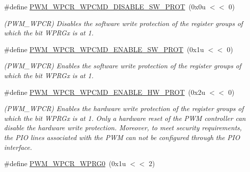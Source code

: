\begin{DoxyCompactItemize}
\item 
\mbox{\label{group__SAMS70__PWM_gab2d512be66c678ac9d977f2bc8cd01ea}} 
\#define \mbox{\hyperlink{group__SAMS70__PWM_gab2d512be66c678ac9d977f2bc8cd01ea}{P\+W\+M\+\_\+\+W\+P\+C\+R\+\_\+\+W\+P\+C\+M\+D\+\_\+\+D\+I\+S\+A\+B\+L\+E\+\_\+\+S\+W\+\_\+\+P\+R\+OT}}~(0x0u $<$$<$ 0)
\begin{DoxyCompactList}\small\item\em (P\+W\+M\+\_\+\+W\+P\+CR) Disables the software write protection of the register groups of which the bit W\+P\+R\+Gx is at \textquotesingle{}1\textquotesingle{}. \end{DoxyCompactList}\item 
\mbox{\label{group__SAMS70__PWM_gad0d48ff8ca75be8265e7caf42e9c8e37}} 
\#define \mbox{\hyperlink{group__SAMS70__PWM_gad0d48ff8ca75be8265e7caf42e9c8e37}{P\+W\+M\+\_\+\+W\+P\+C\+R\+\_\+\+W\+P\+C\+M\+D\+\_\+\+E\+N\+A\+B\+L\+E\+\_\+\+S\+W\+\_\+\+P\+R\+OT}}~(0x1u $<$$<$ 0)
\begin{DoxyCompactList}\small\item\em (P\+W\+M\+\_\+\+W\+P\+CR) Enables the software write protection of the register groups of which the bit W\+P\+R\+Gx is at \textquotesingle{}1\textquotesingle{}. \end{DoxyCompactList}\item 
\mbox{\label{group__SAMS70__PWM_gacc00a56188165fb09bc3482cb2728946}} 
\#define \mbox{\hyperlink{group__SAMS70__PWM_gacc00a56188165fb09bc3482cb2728946}{P\+W\+M\+\_\+\+W\+P\+C\+R\+\_\+\+W\+P\+C\+M\+D\+\_\+\+E\+N\+A\+B\+L\+E\+\_\+\+H\+W\+\_\+\+P\+R\+OT}}~(0x2u $<$$<$ 0)
\begin{DoxyCompactList}\small\item\em (P\+W\+M\+\_\+\+W\+P\+CR) Enables the hardware write protection of the register groups of which the bit W\+P\+R\+Gx is at \textquotesingle{}1\textquotesingle{}. Only a hardware reset of the P\+WM controller can disable the hardware write protection. Moreover, to meet security requirements, the P\+IO lines associated with the P\+WM can not be configured through the P\+IO interface. \end{DoxyCompactList}\item 
\mbox{\label{group__SAMS70__PWM_gafa18dd34b9952720314eaac4d894f935}} 
\#define \mbox{\hyperlink{group__SAMS70__PWM_gafa18dd34b9952720314eaac4d894f935}{P\+W\+M\+\_\+\+W\+P\+C\+R\+\_\+\+W\+P\+R\+G0}}~(0x1u $<$$<$ 2)

\end{DoxyCompactItemize}
